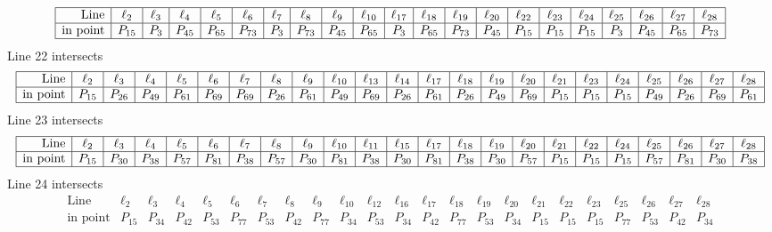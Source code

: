 \documentclass{article}
\begin{document}
{$$\begin{array}{|r*{20}{|c}|}
\hline
\mbox{Line}  & \ell_{2} & \ell_{3} & \ell_{4} & \ell_{5} & \ell_{6} & \ell_{7} & \ell_{8} & \ell_{9} & \ell_{10} & \ell_{17} & \ell_{18} & \ell_{19} & \ell_{20} & \ell_{22} & \ell_{23} & \ell_{24} & \ell_{25} & \ell_{26} & \ell_{27} & \ell_{28}\\
\hline
\mbox{in point}  & P_{15} & P_{3} & P_{45} & P_{65} & P_{73} & P_{3} & P_{73} & P_{45} & P_{65} & P_{3} & P_{65} & P_{73} & P_{45} & P_{15} & P_{15} & P_{15} & P_{3} & P_{45} & P_{65} & P_{73}\\
\hline
\end{array}
$$
Line 22 intersects 
$$
\begin{array}{|r*{22}{|c}|}
\hline
\mbox{Line}  & \ell_{2} & \ell_{3} & \ell_{4} & \ell_{5} & \ell_{6} & \ell_{7} & \ell_{8} & \ell_{9} & \ell_{10} & \ell_{13} & \ell_{14} & \ell_{17} & \ell_{18} & \ell_{19} & \ell_{20} & \ell_{21} & \ell_{23} & \ell_{24} & \ell_{25} & \ell_{26} & \ell_{27} & \ell_{28}\\
\hline
\mbox{in point}  & P_{15} & P_{26} & P_{49} & P_{61} & P_{69} & P_{69} & P_{26} & P_{61} & P_{49} & P_{69} & P_{26} & P_{61} & P_{26} & P_{49} & P_{69} & P_{15} & P_{15} & P_{15} & P_{49} & P_{26} & P_{69} & P_{61}\\
\hline
\end{array}
$$
Line 23 intersects 
$$
\begin{array}{|r*{22}{|c}|}
\hline
\mbox{Line}  & \ell_{2} & \ell_{3} & \ell_{4} & \ell_{5} & \ell_{6} & \ell_{7} & \ell_{8} & \ell_{9} & \ell_{10} & \ell_{11} & \ell_{15} & \ell_{17} & \ell_{18} & \ell_{19} & \ell_{20} & \ell_{21} & \ell_{22} & \ell_{24} & \ell_{25} & \ell_{26} & \ell_{27} & \ell_{28}\\
\hline
\mbox{in point}  & P_{15} & P_{30} & P_{38} & P_{57} & P_{81} & P_{38} & P_{57} & P_{30} & P_{81} & P_{38} & P_{30} & P_{81} & P_{38} & P_{30} & P_{57} & P_{15} & P_{15} & P_{15} & P_{57} & P_{81} & P_{30} & P_{38}\\
\hline
\end{array}
$$
Line 24 intersects 
$$
\begin{array}{|r*{22}{|c}|}
\hline
\mbox{Line}  & \ell_{2} & \ell_{3} & \ell_{4} & \ell_{5} & \ell_{6} & \ell_{7} & \ell_{8} & \ell_{9} & \ell_{10} & \ell_{12} & \ell_{16} & \ell_{17} & \ell_{18} & \ell_{19} & \ell_{20} & \ell_{21} & \ell_{22} & \ell_{23} & \ell_{25} & \ell_{26} & \ell_{27} & \ell_{28}\\
\hline
\mbox{in point}  & P_{15} & P_{34} & P_{42} & P_{53} & P_{77} & P_{53} & P_{42} & P_{77} & P_{34} & P_{53} & P_{34} & P_{42} & P_{77} & P_{53} & P_{34} & P_{15} & P_{15} & P_{15} & P_{77} & P_{53} & P_{42} & P_{34}\\

\end{array}$$}
\end{document}
